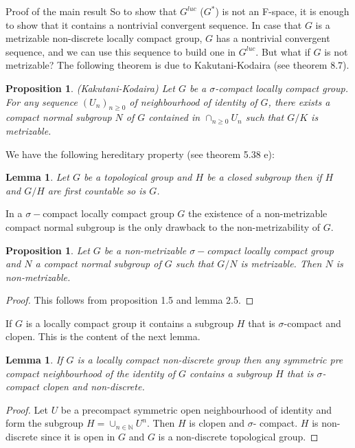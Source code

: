 \documentclass[12pt,a4paper]{amsart}
\theoremstyle{plain}
\newtheorem{lemma}[theorem]{Lemma}
\newtheorem{prop}[theorem]{Proposition}
\theoremstyle{definition}
\begin{document}
\begin{section}{Proof of the main result}
So to show that $G^{luc}$ ($G^*$) is not an F-space, it is enough to show that it contains a nontrivial convergent sequence. In case that $G$ is a metrizable non-discrete locally compact group, $G$ has a nontrivial convergent sequence, and we can use this sequence to build one in $G^{luc}$. But what if $G$ is not metrizable? The following theorem is due to Kakutani-Kodaira (see \cite{MR551496} theorem 8.7).

\begin{prop}
(Kakutani-Kodaira) Let $G$ be a $\sigma$-compact locally compact group. For any sequence $(U_n)_{n\geq 0}$ of neighbourhood of identity of $G$, there exists a compact normal subgroup $N$ of $G$ contained in $\cap_{n\geq 0}U_n$ such that $G/K$ is metrizable.
\end{prop}
We have the following hereditary property (see \cite{MR551496} theorem 5.38 e):
\begin{lemma}
Let $G$ be a topological group and $H$ be a closed subgroup then if $H$ and $G/H$ are first countable so is $G$.
\end{lemma}


In a $\sigma-$compact locally compact group $G$ the existence of a non-metrizable compact normal subgroup is the only drawback to the non-metrizability of $G$.
\begin{prop}
Let $G$ be a non-metrizable $\sigma-$compact locally compact group and $N$ a compact normal subgroup of $G$ such that $G/N$ is metrizable. Then $N$ is non-metrizable.
\end{prop}
\begin{proof}
This follows from proposition 1.5 and lemma 2.5.
\end{proof}
If $G$ is a locally compact group it contains a subgroup $H$ that is $\sigma$-compact and clopen. This is the content of the next lemma.
\begin{lemma}
If $G$ is a locally compact non-discrete group then any symmetric pre compact neighbourhood of the identity of $G$ contains a subgroup $H$ that is $\sigma$-compact clopen and non-discrete.
\end{lemma}

\begin{proof}
Let $U$ be a precompact symmetric open neighbourhood of identity and form the subgroup $H=\cup_{n\in\mathbb{N}}U^n.$ Then $H$ is clopen and $\sigma$- compact. $H$ is non-discrete since it is open in $G$ and $G$ is a non-discrete topological group.
\end{proof}



\end{section}
\end{document}
